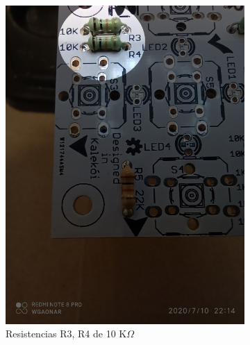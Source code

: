 \documentclass{article}
\begin{document}
\begin{figure}[H]
    \ContinuedFloat \centering
    \begin{subfigure}[t]{0.3\textwidth}
        \centering
        \includegraphics[width=0.9\columnwidth, height=1.2\columnwidth]{images/Botonera/botonera4.jpg}
        \caption{Resistencias R3, R4 de 10 K$\Omega$}
        \label{fig:botonera_resistencias4}
    \end{subfigure}%
    \begin{subfigure}[t]{0.3\textwidth}
        \centering

\end{subfigure}
\end{figure}
\end{document}
